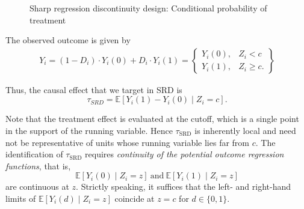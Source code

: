 \begin{figure}[ht]
	\centering
\caption{Sharp regression discontinuity design: Conditional probability of treatment}
\label{Fig:SRDD}
\end{figure}

The observed outcome is given by
\begin{align*}
	Y_i=(1-D_i)\cdot Y_i(0) + D_i\cdot Y_i(1)=\begin{Bmatrix}
		Y_i(0), & Z_i < c\\
		Y_i(1), & Z_i \geq c.
	\end{Bmatrix}
\end{align*}

Thus, the causal effect that we target in SRD is
\[
\tau_{SRD}=\mathbb{E}[Y_i(1)-Y_i(0)\mid Z_i=c].
\]

Note that the treatment effect is evaluated at the cutoff, which is a single point in the support of the running variable. Hence $\tau_{\text{SRD}}$ is inherently local and need not be representative of units whose running variable lies far from $c$.
The identification of $\tau_{\text{SRD}}$ requires \emph{continuity of the potential outcome regression functions}, that is,
\[
\mathbb{E}[Y_i(0)\mid Z_i=z]\ \text{and}\ \mathbb{E}[Y_i(1)\mid Z_i=z]
\]
are continuous at $z$. Strictly speaking, it suffices that the left- and right-hand limits of $\mathbb{E}[Y_i(d)\mid Z_i=z]$ coincide at $z=c$ for $d\in\{0,1\}$.

